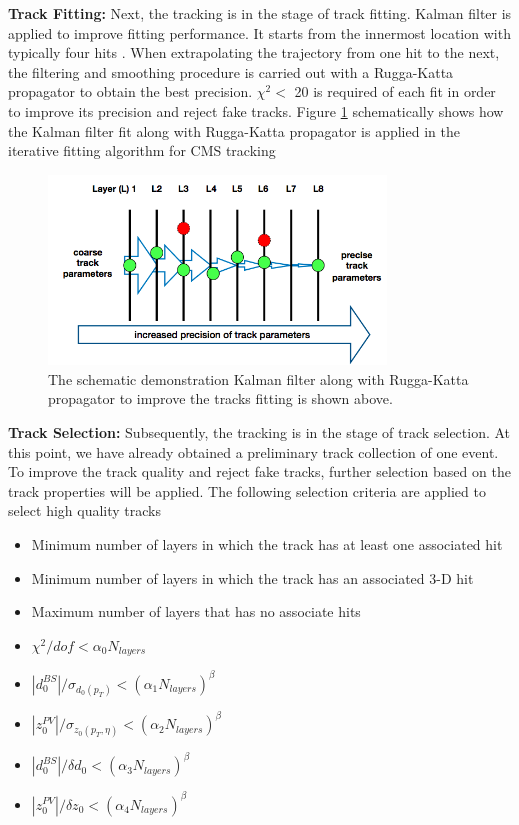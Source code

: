 \textbf{Track Fitting:} Next, the tracking is in the stage of track fitting. Kalman filter \cite{Kalman} is applied to improve fitting performance. It starts from the innermost location with typically four hits \cite{CMSTrack1,CMSTrack2,CMSTrack3}. When extrapolating the trajectory from one hit to the next, the filtering and smoothing procedure is carried out with a Rugga-Katta propagator to obtain the best precision. $\chi^2 < $ 20 is required of each fit in order to improve its precision and reject fake tracks. Figure \ref{KalmanFitting} schematically shows how the Kalman filter fit along with Rugga-Katta propagator is applied in the iterative fitting algorithm for CMS tracking


\begin{figure}[hbtp]
\begin{center}
\includegraphics[width=0.80\textwidth]{Figures/Chapter3/KalmanFitting.png}
\caption{The schematic demonstration Kalman filter along with Rugga-Katta propagator to improve the tracks fitting is shown above.}
\label{KalmanFitting}
\end{center}
\end{figure} 


\textbf{Track Selection:} Subsequently, the tracking is in the stage of track selection. At this point, we have already obtained a preliminary track collection of one event. To improve the track quality and reject fake tracks, further selection based on the track properties will be applied. The following selection criteria are applied to select high quality tracks \cite{CMSTrackComp}

\begin{itemize}
\item Minimum number of layers in which the track has at least one associated hit
\item Minimum number of layers in which the track has an associated 3-D hit
\item Maximum number of layers that has no associate hits
\item $\chi^2/dof < \alpha_0 N_{layers}$ 
\item $|d_0^{BS}|/ \sigma_{d_0(p_T)} < (\alpha_1 N_{layers})^\beta$ 
\item $|z_0^{PV}|/ \sigma_{z_0(p_T,\eta)}  < (\alpha_2 N_{layers})^\beta$ 
\item $|d_0^{BS}|/\delta d_0 < (\alpha_3 N_{layers})^\beta$ 
\item $|z_0^{PV}|/\delta z_0 < (\alpha_4 N_{layers})^\beta$ 
\end{itemize}

